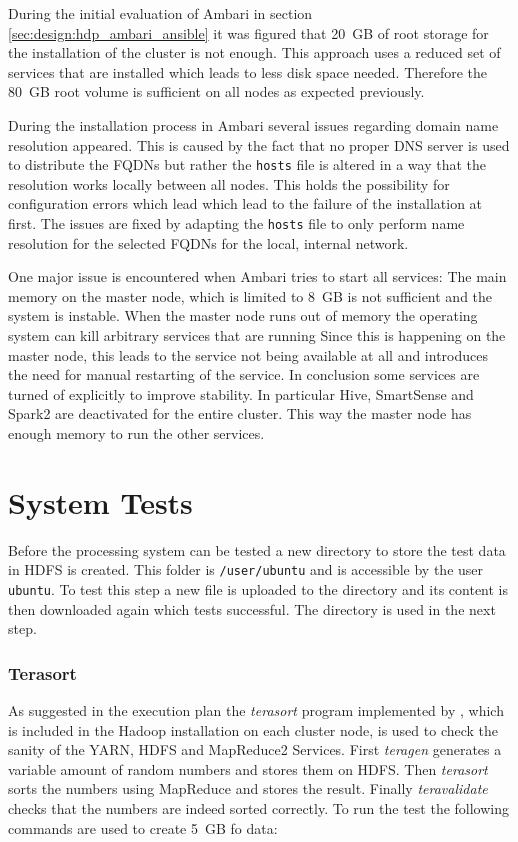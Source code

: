 During the initial evaluation of Ambari in section \vref{sec:design:hdp_ambari_ansible} it was figured that 20~\ac{GB} of root storage for the installation of the cluster is not enough. This approach uses a reduced set of services that are installed which leads to less disk space needed. Therefore the 80~\ac{GB} root volume is sufficient on all nodes as expected previously.

During the installation process in Ambari several issues regarding domain name resolution appeared.
This is caused by the fact that no proper \ac{DNS} server is used to distribute the \acp{FQDN} 
but rather the \texttt{hosts} file is altered in a way that the resolution works locally between all nodes. 
This holds the possibility for configuration errors which lead which lead to the failure of the installation at first.
The issues are fixed by adapting the \texttt{hosts} file to only perform name resolution for the selected \acp{FQDN} for the local, internal network. 

One major issue is encountered when Ambari tries to start all services: The main memory on the master node, which is limited to 8~\ac{GB} is not sufficient and the system is instable.
When the master node runs out of memory the operating system can kill arbitrary services that are running
Since this is happening on the master node, this leads to the service not being available at all and introduces the need for manual restarting of the service.
In conclusion some services are turned of explicitly to improve stability. 
In particular Hive, SmartSense and Spark2 are deactivated for the entire cluster. 
This way the master node has enough memory to run the other services.

\section{System Tests}

Before the processing system can be tested a new directory to store the test data in \ac{HDFS}
is created. 
This folder is \texttt{/user/ubuntu} and is accessible by the user \texttt{ubuntu}.
To test this step a new file is uploaded to the directory and its content is then downloaded again which tests successful. The directory is used in the next step.

\subsubsection{Terasort}

As suggested in the execution plan the \emph{terasort} program implemented by \textcite{omally2008terasort}, which is included in the Hadoop installation on each cluster node, is used to check the sanity of the \ac{YARN}, \ac{HDFS} and MapReduce2 Services.
First \emph{teragen} generates a variable amount of random numbers and stores them on \ac{HDFS}. Then \emph{terasort} sorts the numbers using MapReduce and stores the result.
Finally \emph{teravalidate} checks that the numbers are indeed sorted correctly.
To run the test the following commands are used to create 5~\ac{GB} fo data:

